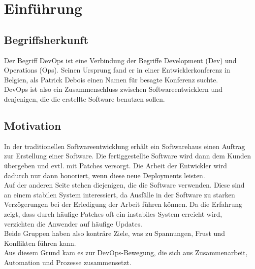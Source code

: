 \documentclass[praktikum,german]{hgbthesis}
\begin{document}

\author{Stefan Trageiser}




\frontmatter
\maketitle

\tableofcontents


\mainmatter

\chapter{Einführung}

\section{Begriffsherkunft}
Der Begriff DevOps ist eine Verbindung der Begriffe Development (Dev) und Operations (Ops). Seinen Ursprung fand er in einer Entwicklerkonferenz in Belgien, als Patrick Debois einen Namen für besagte Konferenz suchte.\\
DevOps ist also ein Zusammenschluss zwischen Softwareentwicklern und denjenigen, die die erstellte Software benutzen sollen.\cite{Peschlow.2012}

\section{Motivation}
In der traditionellen Softwareentwicklung erhält ein Softwarehaus einen Auftrag zur Erstellung einer Software. Die fertiggestellte Software wird dann dem Kunden übergeben und evtl. mit Patches versorgt. Die Arbeit der Entwickler wird dadurch nur dann honoriert, wenn diese neue Deployments leisten.\\
Auf der anderen Seite stehen diejenigen, die die Software verwenden. Diese sind an einem stabilen System interessiert, da Ausfälle in der Software zu starken Verzögerungen bei der Erledigung der Arbeit führen können. Da die Erfahrung zeigt, dass durch häufige Patches oft ein instabiles System erreicht wird, verzichten die Anwender auf häufige Updates.\\
Beide Gruppen haben also konträre Ziele, was zu Spannungen, Frust und Konflikten führen kann.\\
Aus diesem Grund kam es zur DevOps-Bewegung, die sich aus Zusammenarbeit, Automation und Prozesse zusammensetzt.\cite[S. 2 ff]{Peschlow.2012}\\
\end{document}
